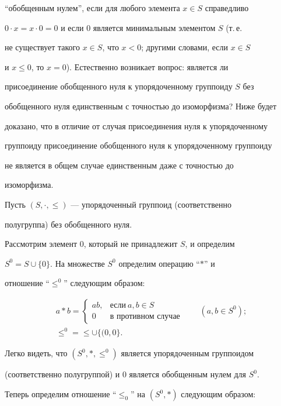 ``обобщенным нулем'', если для любого элемента $x\in S$ справедливо 


$0\cdot x=x\cdot0=0$ и если 0 является минимальным элементом $S$ (т.\,е. 


не существует такого $x\in S$, что $x<0$; другими словами, если $x\in S$ 


и $x\le0$, то $x=0$). Естественно возникает вопрос: является ли 


присоединение обобщенного нуля к упорядоченному группоиду $S$ без 


обобщенного нуля единственным с точностью до изоморфизма? Ниже будет 


доказано, что в отличие от случая присоединения нуля к упорядоченному 


группоиду присоединение обобщенного нуля к упорядоченному группоиду


не является в общем случае единственным даже с точностью до 


изоморфизма. 


 


Пусть $(S,\cdot,\le)$ --- упорядоченный группоид (соответственно 


полугруппа) без обобщенного нуля.


Рассмотрим элемент 0, который не принадлежит $S$, и определим 


$S^0=S\cup\{0\}$. На множестве $S^0$ определим операцию ``$*$'' и 


отношение ``$\le^0$'' следующим образом: 


\begin{gather*} 


a*b=\begin{cases} 


ab, & \text{если} \ a,b\in S\\ 


0 & \text{в противном случае} 


\end{cases} 


\qquad (a,b\in S^0); \\


\le^0=\le\cup\{(0,0\}. 


\end{gather*} 


Легко видеть, что $(S^0,*,\le^0)$ является упорядоченным группоидом 


(соответственно полугруппой) и 0 является обобщенным нулем для $S^0$. 


Теперь определим отношение ``$\le_0$'' на $(S^0,*)$ следующим образом: 


